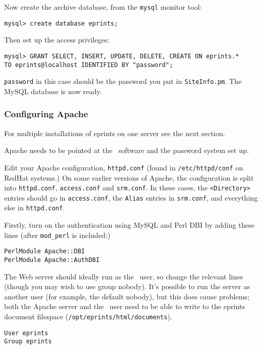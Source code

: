 Now create the archive database, from the {\tt mysql} monitor tool:

\begin{verbatim}
mysql> create database eprints;
\end{verbatim}

Then set up the access privileges:

\begin{verbatim}
mysql> GRANT SELECT, INSERT, UPDATE, DELETE, CREATE ON eprints.*
TO eprints@localhost IDENTIFIED BY "password";
\end{verbatim}

{\tt password} in this case should be the password you put in {\tt SiteInfo.pm}. The MySQL database is now ready.


\subsubsection{Configuring Apache}
\label{manual_apache}

For multiple installations of eprints on one server see the next section.

Apache needs to be pointed at the \eprints\ software and the password system set up.

Edit your Apache configuration, {\tt httpd.conf} (found in {\tt /etc/httpd/conf} on RedHat systems.) On some earlier versions of Apache, the configuration is split into {\tt httpd.conf}, {\tt access.conf} and {\tt srm.conf}.  In these cases, the {\tt <Directory>} entries should go in {\tt access.conf}, the {\tt Alias} entries in {\tt srm.conf}, and everything else in {\tt httpd.conf}.

Firstly, turn on the authentication using MySQL and Perl DBI by adding these lines (after {\tt mod\_perl} is included:)

\begin{verbatim}
PerlModule Apache::DBI
PerlModule Apache::AuthDBI
\end{verbatim}

The Web server should ideally run as the \eprints\ user, so change the relevant lines (though you may wish to use group nobody). It's possible to run the server as another user (for example, the default nobody), but this does cause problems; both the Apache server and the \eprints\ user need to be able to write to the eprints document filespace ({\tt /opt/eprints/html/documents}).

\begin{verbatim}
User eprints
Group eprints
\end{verbatim}


